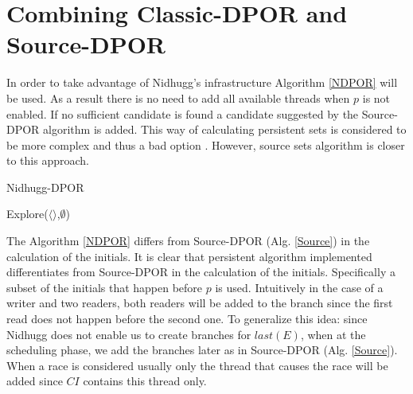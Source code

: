 \section{Combining Classic-DPOR and Source-DPOR}

In order to take advantage of Nidhugg's infrastructure Algorithm \ref{NDPOR} will be used. As a result there is no need to add all
available threads when $p$ is not enabled. If no sufficient candidate is found
a candidate suggested by the Source-DPOR algorithm is added. This way of calculating persistent sets is considered to be more 
complex and thus a bad option \cite{Gode05}. However, source sets algorithm is closer to this approach.

\begin{algorithm}
    \caption{Nidhugg-DPOR}
    \label{NDPOR}
    Explore($\langle \rangle$,$\emptyset$)\;
\end{algorithm}

The Algorithm \ref{NDPOR} differs from Source-DPOR (Alg. \ref{Source}) in the calculation of the initials.
It is clear that persistent algorithm implemented differentiates from Source-DPOR in the calculation of the initials. 
Specifically a subset of the initials that happen before $p$ is used. 
Intuitively in the case of a writer and two readers, both readers will be added to the branch since the first read does not
happen before the second one.
To generalize this idea: since Nidhugg does not enable us to create branches for $last(E)$, when at the scheduling phase, we add the 
branches later as in Source-DPOR (Alg. \ref{Source}). When a race is considered usually only the thread that causes the race will be added since 
$CI$ contains this thread only.

